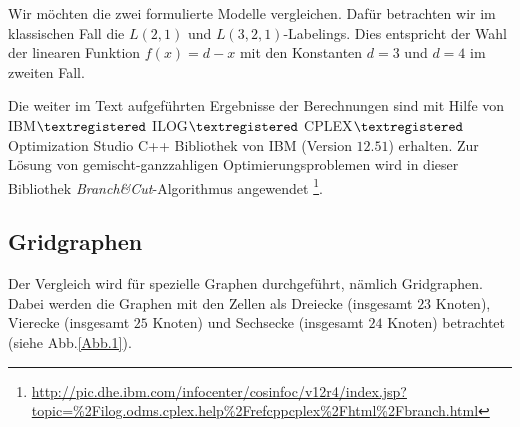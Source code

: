 \documentclass[
	fontsize=12pt,
	paper=a4,
	twoside=false,
	numbers=noenddot,
	plainheadsepline,
	toc=listof,
	toc=bibliography
]{scrartcl}
\begin{document}
Wir möchten die zwei formulierte Modelle vergleichen. Dafür betrachten wir im klassischen Fall die $L(2,1)$ und $L(3,2,1)$-Labelings. Dies entspricht der Wahl der linearen Funktion $f(x)= d-x$ mit den Konstanten $d=3$ und $d=4$ im zweiten Fall.

Die weiter im Text aufgeführten Ergebnisse der Berechnungen sind mit Hilfe von IBM$\textregistered$ ILOG$\textregistered$ CPLEX$\textregistered$ Optimization Studio C++ Bibliothek von IBM (Version $12.51$) erhalten. Zur Lösung von gemischt-ganzzahligen Optimierungsproblemen wird in dieser Bibliothek {\it Branch\&Cut}-Algorithmus angewendet \footnote{\url{http://pic.dhe.ibm.com/infocenter/cosinfoc/v12r4/index.jsp?topic=\%2Filog.odms.cplex.help\%2Frefcppcplex\%2Fhtml\%2Fbranch.html}}.

\subsection*{Gridgraphen}
Der Vergleich wird für spezielle Graphen durchgeführt, nämlich Gridgraphen. Dabei werden die Graphen mit den Zellen als Dreiecke (insgesamt $23$ Knoten), Vierecke (insgesamt $25$ Knoten) und Sechsecke (insgesamt $24$ Knoten) betrachtet (siehe Abb.\ref{Abb.1}). 
\end{document}
